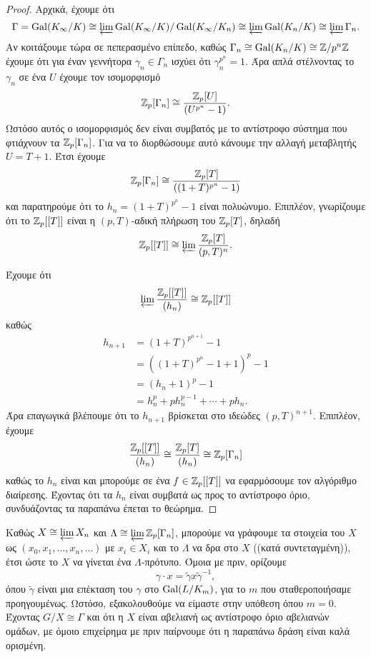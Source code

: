 \begin{proof}
    Αρχικά, έχουμε ότι
    $$\Gamma = \operatorname{Gal}(K_\infty/K) \cong \varprojlim \operatorname{Gal}(K_\infty /K)/\operatorname{Gal}( K_\infty /K_n) \cong \varprojlim \operatorname{Gal}(K_n/K) \cong \varprojlim \Gamma_n .$$ %
    \noindent Αν κοιτάξουμε τώρα σε πεπερασμένο επίπεδο, καθώς $\Gamma_n \cong \operatorname{Gal}(K_n/K)\cong \mathbb{Z}/p^n \mathbb{Z}$ έχουμε ότι για έναν γεννήτορα $\gamma_n \in \Gamma_n$ ισχύει ότι $\gamma_n^{p^n} = 1$. Άρα απλά στέλνοντας το $\gamma_n$ σε ένα $U$ έχουμε τον ισομορφισμό
    $$\mathbb{Z}_p[\Gamma_n] \cong \frac{\mathbb{Z}_p[U]}{(U^{p^n}-1)}.$$ Ωστόσο αυτός ο ισομορφισμός δεν είναι συμβατός με το αντίστροφο σύστημα που φτιάχνουν τα $\mathbb{Z}_p[\Gamma_n]$. Για να το διορθώσουμε αυτό κάνουμε την αλλαγή μεταβλητής $U=T+1$. Έτσι έχουμε
    $$\mathbb{Z}_p[\Gamma_n] \cong \frac{\mathbb{Z}_p[T]}{\left((1+T)^{p^n}-1\right)}$$ και παρατηρούμε ότι το $h_n = (1+T)^{p^n}-1$ είναι  πολυώνυμο. Επιπλέον, γνωρίζουμε ότι το $\mathbb{Z}_p[[T]]$ είναι η $(p,T)$-αδική πλήρωση του $\mathbb{Z}_p[T]$, δηλαδή
    $$\mathbb{Z}_p[[T]] \cong \varprojlim \frac{\mathbb{Z}_p[T]}{(p,T)^n}.$$

    \noindent Έχουμε ότι
    $$\varprojlim \frac{\mathbb{Z}_p[[T]]}{(h_n)} \cong \mathbb{Z}_p[[T]]$$
    καθώς 
    \begin{align*}
        h_{n+1} & = (1+T)^{p^{n+1}} - 1 \\
        & = \left((1+T)^{p^n} -1 + 1\right)^p - 1 \\
        & = (h_n+1)^p - 1 \\
        &= h^p_n + ph_n^{p-1} + \cdots + ph_n .
    \end{align*}
    \noindent Άρα επαγωγικά βλέπουμε ότι το $h_{n+1}$ βρίσκεται στο ιδεώδες $(p,T)^{n+1}$. Επιπλέον, έχουμε
    $$\frac{\mathbb{Z}_p[[T]]}{(h_n)} \cong \frac{\mathbb{Z}_p[T]}{(h_n)} \cong \mathbb{Z}_p[\Gamma_n]$$ καθώς το $h_n$ είναι  και μπορούμε σε ένα $f \in \mathbb{Z}_p[[T]]$ να εφαρμόσουμε τον αλγόριθμο διαίρεσης. Έχοντας ότι τα $h_n$ είναι συμβατά ως προς το αντίστροφο όριο, συνδυάζοντας τα παραπάνω έπεται το θεώρημα.
\end{proof}

\noindent Καθώς $X\cong \varprojlim X_n$ και $\Lambda \cong \varprojlim \mathbb{Z}_p[\Gamma_n]$, μπορούμε να γράφουμε τα στοιχεία του $X$ ως 
$(x_0,x_1,\ldots,x_n,\ldots)$ με $x_i \in X_i$ και το $\Lambda$ να δρα στο $X$ ((κατά συντεταγμένη)), έτσι ώστε το $X$ να γίνεται ένα 
$\Lambda$-πρότυπο. Όμοια με πριν, ορίζουμε
$$\gamma \cdot x = \tilde{\gamma} x \tilde{\gamma}^{-1},$$ όπου $\tilde{\gamma}$ είναι μια επέκταση του $\gamma$ στο $\operatorname{Gal}(L/K_m)$, για το $m$ που σταθεροποιήσαμε προηγουμένως. Ωστόσο, εξακολουθούμε να είμαστε στην υπόθεση όπου $m=0$. Έχοντας $G/X \cong \Gamma$ και ότι η $X$ είναι αβελιανή ως αντίστροφο όριο αβελιανών ομάδων, με όμοιο επιχείρημα με πριν παίρνουμε ότι η παραπάνω δράση είναι καλά ορισμένη.



